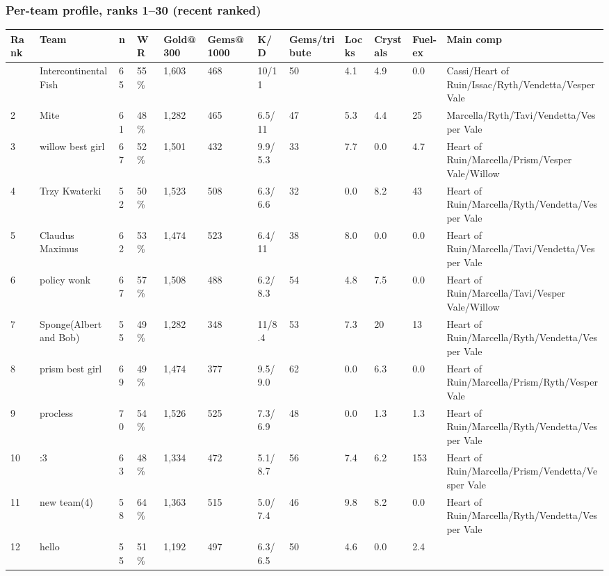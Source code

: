 \documentclass[
  10pt,
]{article}
\newcounter{none} %
\begin{document}
\subsubsection{Per-team profile, ranks 1--30 (recent
ranked)}\label{per-team-profile-ranks-130-recent-ranked-1}

{\def\LTcaptype{none} %
\begin{landscape}
\begin{longtable}[]{@{}llllllllllll@{}}
\toprule\noalign{}
Rank & Team & n & WR & Gold@300 & Gems@1000 & K/D & Gems/tribute & Locks
& Crystals & Fuel-ex & Main comp \\
\midrule\noalign{}
\endhead
\bottomrule\noalign{}
\endlastfoot
1 & Intercontinental Fish & 65 & 55\% & 1,603 & 468 & 10/11 & 50 & 4.1 &
4.9 & 0.0 & Cassi/Heart of Ruin/Issac/Ryth/Vendetta/Vesper Vale \\
2 & Mite & 61 & 48\% & 1,282 & 465 & 6.5/11 & 47 & 5.3 & 4.4 & 25 &
Marcella/Ryth/Tavi/Vendetta/Vesper Vale \\
3 & willow best girl & 67 & 52\% & 1,501 & 432 & 9.9/5.3 & 33 & 7.7 &
0.0 & 4.7 & Heart of Ruin/Marcella/Prism/Vesper Vale/Willow \\
4 & Trzy Kwaterki & 52 & 50\% & 1,523 & 508 & 6.3/6.6 & 32 & 0.0 & 8.2 &
43 & Heart of Ruin/Marcella/Ryth/Vendetta/Vesper Vale \\
5 & Claudus Maximus & 62 & 53\% & 1,474 & 523 & 6.4/11 & 38 & 8.0 & 0.0
& 0.0 & Heart of Ruin/Marcella/Tavi/Vendetta/Vesper Vale \\
6 & policy wonk & 67 & 57\% & 1,508 & 488 & 6.2/8.3 & 54 & 4.8 & 7.5 &
0.0 & Heart of Ruin/Marcella/Tavi/Vesper Vale/Willow \\
7 & Sponge(Albert and Bob) & 55 & 49\% & 1,282 & 348 & 11/8.4 & 53 & 7.3
& 20 & 13 & Heart of Ruin/Marcella/Ryth/Vendetta/Vesper Vale \\
8 & prism best girl & 69 & 49\% & 1,474 & 377 & 9.5/9.0 & 62 & 0.0 & 6.3
& 0.0 & Heart of Ruin/Marcella/Prism/Ryth/Vesper Vale \\
9 & procless & 70 & 54\% & 1,526 & 525 & 7.3/6.9 & 48 & 0.0 & 1.3 & 1.3
& Heart of Ruin/Marcella/Ryth/Vendetta/Vesper Vale \\
10 & :3 & 63 & 48\% & 1,334 & 472 & 5.1/8.7 & 56 & 7.4 & 6.2 & 153 &
Heart of Ruin/Marcella/Prism/Vendetta/Vesper Vale \\
11 & new team(4) & 58 & 64\% & 1,363 & 515 & 5.0/7.4 & 46 & 9.8 & 8.2 &
0.0 & Heart of Ruin/Marcella/Ryth/Vendetta/Vesper Vale \\
12 & hello & 55 & 51\% & 1,192 & 497 & 6.3/6.5 & 50 & 4.6 & 0.0 & 2.4 &

\end{longtable}
\end{landscape}}
\end{document}
